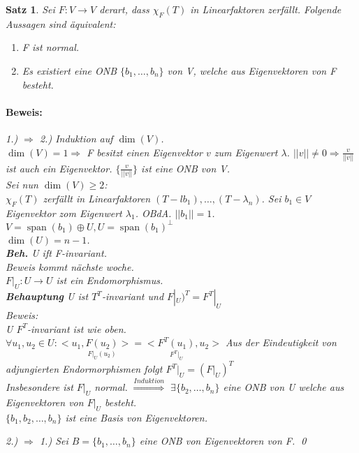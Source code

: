 \documentclass{report}
\newcommand{\lb}{\lambda}
\DeclareMathOperator{\Span}{span}
\theoremstyle{customrem}
\theoremstyle{customdef}
\newtheorem{satz}[definition]{Satz}
\renewenvironment{proof}{\paragraph{Beweis: }}{\qed}
\theoremstyle{customenv}
\begin{document}
\begin{satz}
  Sei \(F : V \to V\) derart, dass \(\chi_F(T)\) in Linearfaktoren zerf\"allt.
  Folgende Aussagen sind \"aquivalent:\\
  \begin{enumerate}
    \item {
      F ist normal.
    }
    \item {
      Es existiert eine ONB \(\{b_1, \dots, b_n\}\) von V, welche aus
      Eigenvektoren von F besteht.
    }
  \end{enumerate}
  \begin{proof}
  \item[1.) \(\Rightarrow\) 2.)] {
      Induktion auf \(\dim(V)\).\\
      \(\dim(V) = 1 \Rightarrow\) F besitzt einen Eigenvektor \(v\) zum
      Eigenwert \(\lb\). \(||v|| \neq 0 \Rightarrow \frac{v}{||v||}\) ist auch
      ein Eigenvektor. \(\{\frac{v}{||v||}\}\) ist eine ONB von V.\\
      Sei nun \(\dim(V) \ge 2\):\\
      \(\chi_F(T)\) zerf\"allt in Linearfaktoren
      \((T - lb_1), \dots, (T - \lb_n)\).
      Sei \(b_1 \in V\) Eigenvektor zom Eigenwert \(\lb_1\). OBdA.
      \(||b_1|| = 1\). \(V = \Span(b_1) \oplus U, U = \Span(b_1)^\bot\)\\
      \(\dim(U) = n - 1\).\\
      \textbf{Beh.} U ift F-invariant.\\
      Beweis kommt n\"achste woche.\\
      \(F|_U : U \to U\) ist ein Endomorphismus.\\
      \textbf{Behauptung}
      U ist \(T^T\)-invariant und \(F|_U)^T = F^T |_U\)\\
      Beweis:\\
      U \(F^T\)-invariant ist wie oben.\\
      \(\forall u_1, u_2 \in U : <u_1, \underset{F|_U(u_2)}{F(u_2)}> = <\underset{F^T|_U}{F^T(u_1)}, u_2>\)
      Aus der Eindeutigkeit von adjungierten Endormorphismen folgt
      \(F^T|_U = (F|_U)^T\)\\
      Insbesondere ist \(F|_U\) normal. \(\overset{Induktion}{\Rightarrow}\)
      \(\exists \{b_2, \dots, b_n\}\) eine ONB von U welche aus Eigenvektoren
      von \(F|_U\) besteht.\\
      \(\{b_1, b_2, \dots, b_n\}\) ist eine Basis von Eigenvektoren.
    }
    \item[2.) \(\Rightarrow\) 1.)] {
        Sei \(B = \{b_1, \dots, b_n\}\) eine ONB von Eigenvektoren von F.
}
\end{proof}
\end{satz}
\end{document}
